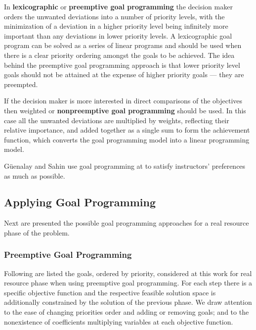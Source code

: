 In \textbf{lexicographic} or \textbf{preemptive goal programming} the decision maker orders the unwanted deviations into a number of priority levels, with the minimization of a deviation in a higher priority level being infinitely more important than any deviations in lower priority levels. A lexicographic goal program can be solved as a series of linear programs and should be used when there is a clear priority ordering amongst the goals to be achieved. The idea behind the preemptive goal programming approach is that lower priority level goals should not be attained at the expense of higher priority goals --- they are preempted.

If the decision maker is more interested in direct comparisons of the objectives then weighted or \textbf{nonpreemptive goal programming} should be used. In this case all the unwanted deviations are multiplied by weights, reflecting their relative importance, and added together as a single sum to form the achievement function, which converts the goal programming model into a linear programming model.

G\"{u}enalay and Sahin use goal programming at \cite{Guenalay2006} to satisfy instructors' preferences as much as possible.


\subsection{Applying Goal Programming}

Next are presented the possible goal programming approaches for a real resource phase of the problem.


\subsubsection{Preemptive Goal Programming}

Following are listed the goals, ordered by priority, considered at this work for real resource phase when using preemptive goal programming. For each step there is a specific objective function and the respective feasible solution space is additionally constrained by the solution of the previous phase. We draw attention to the ease of changing priorities order and adding or removing goals; and to the nonexistence of coefficients multiplying variables at each objective function.

